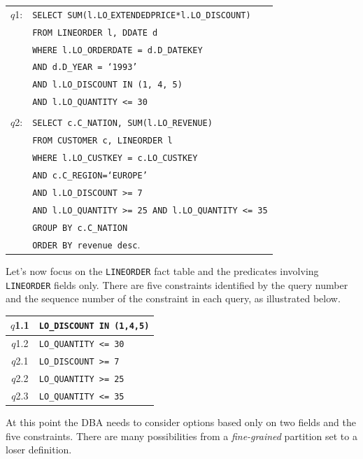 \documentclass[runningheads]{comsis2}
\begin{document}
\begin{center}
{\small
\begin{tabular}{rl}
$q$1:	& {\tt SELECT SUM(l.LO$\_$EXTENDEDPRICE*l.LO\_DISCOUNT)} \\ 
		& {\tt FROM LINEORDER l, DDATE d} \\
		& {\tt WHERE l.LO\_ORDERDATE = d.D\_DATEKEY} \\
		& {\tt AND d.D\_YEAR = `1993'} \\
		& {\tt AND l.LO\_DISCOUNT IN (1, 4, 5)} \\
        & {\tt AND l.LO\_QUANTITY <= 30} \\ 
		&						   \\	        
$q$2:	& {\tt SELECT c.C\_NATION, SUM(l.LO\_REVENUE)} \\ 
		& {\tt FROM CUSTOMER c, LINEORDER l} \\
		& {\tt WHERE l.LO\_CUSTKEY = c.LO\_CUSTKEY} \\
		& {\tt AND c.C\_REGION=`EUROPE'} \\
		& {\tt AND l.LO\_DISCOUNT >= 7} \\
		& {\tt AND l.LO\_QUANTITY >= 25 AND l.LO\_QUANTITY <= 35} \\
		& {\tt GROUP BY c.C\_NATION} \\
		& {\tt ORDER BY revenue desc}. \\
\end{tabular}
}
\end{center}

Let's now focus on the {\tt LINEORDER} fact table and 
the predicates involving {\tt LINEORDER} fields only. 
There are five constraints identified by the query number 
and the sequence number of the constraint in each query, as illustrated below.
\begin{center}
\begin{tabular}{|c|l|}\hline 
$q$1.1 & {\tt LO\_DISCOUNT IN (1,4,5)} \\ \hline
$q$1.2 & {\tt LO\_QUANTITY <= 30} \\ \hline
$q$2.1 & {\tt LO\_DISCOUNT >= 7} \\ \hline
$q$2.2 & {\tt LO\_QUANTITY >= 25}\\ \hline
$q$2.3 & {\tt LO\_QUANTITY <= 35} \\ \hline 
\end{tabular}
\end{center}
At this point the DBA needs to consider options 
based only on two fields and the five constraints. 
There are many possibilities from a {\em fine-grained} partition set 
to a loser definition. 
\end{document}

